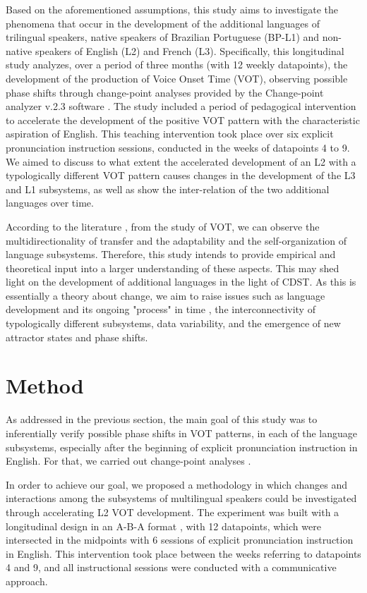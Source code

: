 Based on the aforementioned assumptions, this study aims to investigate the
phenomena that occur in the development of the additional languages of
trilingual speakers, native speakers of Brazilian Portuguese (BP-L1) and
non-native speakers of English (L2) and French (L3). Specifically, this
longitudinal study analyzes, over a period of three months (with 12 weekly
datapoints), the development of the production of Voice Onset Time (VOT),
observing possible phase shifts through change-point analyses \citep[cf.]{taylorwayne}
provided by the Change-point analyzer v.2.3 software \citep{taylor-analyzer}. 
The study included a period of pedagogical intervention to accelerate
the development of the positive VOT pattern with the characteristic aspiration
of English. This teaching intervention took place over six explicit
pronunciation instruction sessions, conducted in the weeks of datapoints 4 to
9. We aimed to discuss to what extent the accelerated development of an L2 with
a typologically different VOT pattern causes changes in the development of the
L3 and L1 subsystems, as well as show the inter-relation of the two additional
languages over time.

According to the literature \citep[cf.]{schereschewsky2021}, from the study of VOT,
we can observe the multidirectionality of transfer and the adaptability and the
self-organization of language subsystems. Therefore, this study intends to
provide empirical and theoretical input into a larger  understanding of these
aspects. This may shed light on the development of additional languages in the
light of CDST. As this is essentially a theory about change, we aim to raise
issues such as language development and its ongoing "process" in time \citep[cf.]{lowie2015,lowie2019},
the interconnectivity of typologically different
subsystems, data variability, and the emergence of new attractor states and
phase shifts.


\section{Method}
As addressed in the previous section, the main goal of this study was to
inferentially verify possible phase shifts in VOT patterns, in each of the
language subsystems, especially after the beginning of explicit pronunciation
instruction in English. For that, we carried out change-point analyses \citep[cf.]{taylorwayne}.

In order to achieve our goal, we proposed a methodology in which changes and
interactions among the subsystems of multilingual speakers could be
investigated through accelerating L2 VOT development. The experiment was built
with a longitudinal design in an A-B-A format \citep[cf.]{hiver2020},
with 12 datapoints, which were intersected in the midpoints with 6 sessions of
explicit pronunciation instruction in English. This intervention took place
between the weeks referring to datapoints 4 and 9, and all instructional
sessions were conducted with a communicative approach.


